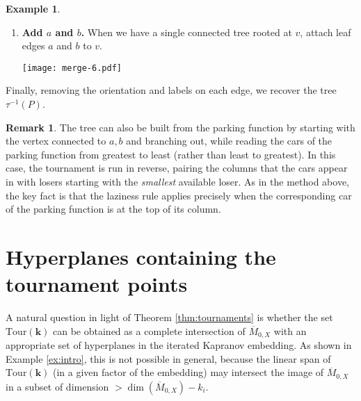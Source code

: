 \documentclass[11pt]{amsart}
\newcommand{\Mbar}{\overline{M}}
\newcommand{\Tour}{\mathrm{Tour}}
\numberwithin{thm}{section}
\numberwithin{equation}{section}
\numberwithin{figure}{section}
\theoremstyle{definition}
\newtheorem{example}[thm]{Example}
\newtheorem{remark}[thm]{Remark}
\begin{document}
\begin{example}
\begin{enumerate}
\begin{center}
    \end{center}
     We now repeat the merge and extend steps for cars $2,3,\ldots$.  The running example is shown below.
     \begin{center}
         \texttt{[image: merge-3.pdf]} \hspace{2cm} \texttt{[image: merge-4.pdf]}
         \hspace{2cm} \texttt{[image: merge-5.pdf]}
     \end{center}

     \item \textbf{Add $a$ and $b$.}  When we have a single connected tree rooted at $v$, attach leaf edges $a$ and $b$ to $v$.
     \begin{center}
         \texttt{[image: merge-6.pdf]}
     \end{center}
\end{enumerate}
Finally, removing the orientation and labels on each edge, we recover the tree $\tau^{-1}(P)$.
\end{example}
 
 \begin{remark}
 The tree can also be built from the parking function by starting with the vertex connected to $a,b$ and branching out, while reading the cars of the parking function from greatest to least (rather than least to greatest). In this case, the tournament is run in reverse, pairing the columns that the cars appear in with losers starting with the \textit{smallest} available loser. As in the method above, the key fact is that the laziness rule applies precisely when the corresponding car of the parking function is at the top of its column.
 \end{remark}

\section{Hyperplanes containing the tournament points}\label{sec:hyperplanes}

A natural question in light of Theorem \ref{thm:tournaments} is whether the set $\Tour(\mathbf{k})$ can be obtained as a complete intersection of $\Mbar_{0, X}$ with an appropriate set of hyperplanes in the iterated Kapranov embedding. As shown in Example \ref{ex:intro}, this is not possible in general, because the linear span of $\Tour(\mathbf{k})$ (in a given factor of the embedding) may intersect the image of $\Mbar_{0, X}$ in a subset of dimension $> \dim(\Mbar_{0,X}) - k_i$.
\end{document}
